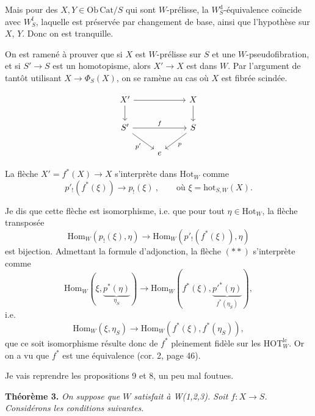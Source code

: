 \documentclass[11pt]{article}
\newcommand{\printedpage}[1]{\marginpar{\footnotesize p.~#1}}
\newcommand{\msp}[1]{\marginpar{\footnotesize [#1]}}
\newcommand{\Hot}{\mathrm{Hot}}
\newcommand{\hot}{\mathrm{hot}}
\newcommand{\HOTlc}{\mathrm{HOT}^{\mathrm{lc}}_W}
\newcommand{\Hom}{\mathrm{Hom}}
\newcommand{\Wd}{W^{\mathrm{d}}_S}
\newcommand{\Wf}{W^{\mathrm{f}}_S}
\begin{document}
Mais pour des $X, Y \in \mathrm{Ob}\,\mathrm{Cat}/S$ qui sont $W$-prélisse, la $\Wd$-équivalence coïncide avec $\Wf$, laquelle est préservée par changement de base, ainsi que l'hypothèse sur $X$, $Y$. Donc on est tranquille.

On est ramené à prouver que si $X$ est $W$-prélisse sur $S$ et une $W$-pseudofibration, et si $S' \longrightarrow S$ est un homotopisme, alors $X' \longrightarrow X$ est dans $W$. Par l'argument de tantôt utilisant $X \longrightarrow \Phi_S(X)$, on se ramène au cas où $X$ est fibrée scindée.

\printedpage{36}

\msp{page 50}
\[ \begin{tikzcd}
X' \arrow[rr] \arrow[d] & & X \arrow[d] \\
S' \arrow[rr, "f"] \arrow[dr, "p'"'] & & S \arrow[dl, "p"] \\
 & e &
\end{tikzcd} \]

La flèche $X' = f^*(X) \longrightarrow X$ s'interprète dans $\Hot_W$ comme
\[ p'_!(f^*(\xi)) \longrightarrow p_!(\xi) \ , \qquad \text{où } \xi = \hot_{S,W}(X). \tag*{$(*)$} \]

Je dis que cette flèche est isomorphisme, i.e. que pour tout $\eta \in \Hot_W$, la flèche transposée
\[ \Hom_W(p_!(\xi),\eta) \longrightarrow \Hom_W(p'_!(f^*(\xi)),\eta) \tag*{$(**)$} \]
est bijection. Admettant la formule d'adjonction, la flèche $(**)$ s'interprète comme
\[ \Hom_W(\xi,\underbrace{p^*(\eta)}_{\eta_S}) \longrightarrow \Hom_W(f^*(\xi),\underbrace{p'^*(\eta)}_{f^*(\eta_S)}), \]
i.e.
\[ \Hom_W(\xi,\eta_S) \longrightarrow \Hom_W(f^*(\xi),f^*(\eta_S)), \]
que ce soit isomorphisme résulte donc de $f^*$ pleinement fidèle sur les $\HOTlc$. Or on a vu que $f^*$ est une équivalence (cor. 2, page 46).

\msp{page 51}
Je vais reprendre les propositions 9 et 8, un peu mal foutues.

\textbf{Théorème 3.} \textit{On suppose que $W$ satisfait à \textup{W(1,2,3)}. Soit $f : X \longrightarrow S$. Considérons les conditions suivantes.}
\end{document}
